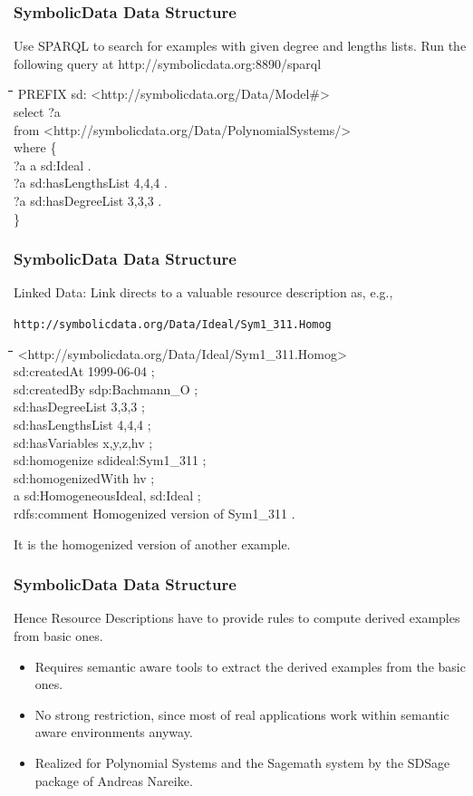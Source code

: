 \documentclass{beamer}
\newenvironment{code}{\footnotesize\tt \begin{tabbing}
\hskip12pt\=\hskip12pt\=\hskip12pt\=\hskip12pt\=\hskip5cm\=\hskip5cm\=\kill}
{\end{tabbing}}
\begin{document}
\begin{frame}\frametitle{SymbolicData Data Structure}
Use SPARQL to search for examples with given degree and lengths lists. Run the
following query at http://symbolicdata.org:8890/sparql

\begin{code}
  PREFIX sd: <http://symbolicdata.org/Data/Model\#>\\ 
  select ?a \\
  from <http://symbolicdata.org/Data/PolynomialSystems/>\\
  where \{\+\\
    ?a a sd:Ideal . \\
    ?a sd:hasLengthsList {\dq}4,4,4{\dq} . \\
    ?a sd:hasDegreeList {\dq}3,3,3{\dq} . \-\\
  \} 
\end{code}
\end{frame}

\begin{frame}\frametitle{SymbolicData Data Structure}
Linked Data: Link directs to a valuable resource description as, e.g., 

\texttt{http://symbolicdata.org/Data/Ideal/Sym1\_311.Homog}
\begin{code}
  <http://symbolicdata.org/Data/Ideal/Sym1\_311.Homog> \+\\
  sd:createdAt {\dq}1999-06-04{\dq} ;\\
  sd:createdBy sdp:Bachmann\_O ;\\
  sd:hasDegreeList {\dq}3,3,3{\dq} ;\\
  sd:hasLengthsList {\dq}4,4,4{\dq} ;\\
  sd:hasVariables {\dq}x,y,z,hv{\dq} ;\\
  sd:homogenize sdideal:Sym1\_311 ;\\
  sd:homogenizedWith {\dq}hv{\dq} ;\\
  a sd:HomogeneousIdeal, sd:Ideal ;\\
  rdfs:comment {\dq}Homogenized version of Sym1\_311{\dq} .
\end{code}
It is the homogenized version of another example.
\end{frame}

\begin{frame}\frametitle{SymbolicData Data Structure}
Hence Resource Descriptions have to provide rules to compute derived examples
from basic ones.
\begin{itemize}
\item Requires semantic aware tools to extract the derived examples from the
  basic ones.
\item No strong restriction, since most of real applications work within
  semantic aware environments anyway.
\item Realized for Polynomial Systems and the Sagemath system by the SDSage
  package of Andreas Nareike.
\end{itemize}
\end{frame}
\end{document}
